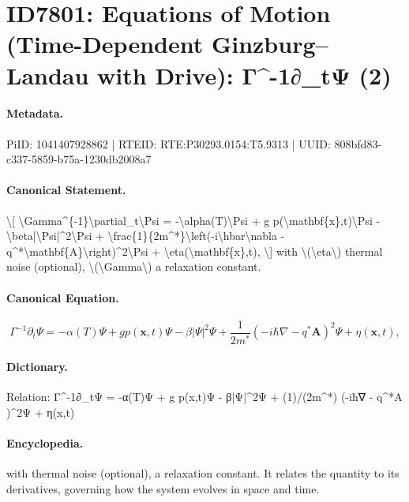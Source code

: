 \section*{ID7801: Equations of Motion (Time-Dependent Ginzburg–Landau with Drive): Γ\textasciicircum{}-1∂\_tΨ (2)}
\paragraph{Metadata.}
PiID: 1041407928862 | RTEID: RTE:P30293.0154:T5.9313 | UUID: 808bfd83-c337-5859-b75a-1230db2008a7

\paragraph{Canonical Statement.}
\textbackslash{}[ \textbackslash{}Gamma\textasciicircum{}\{-1\}\textbackslash{}partial\_t\textbackslash{}Psi = -\textbackslash{}alpha(T)\textbackslash{}Psi + g p(\textbackslash{}mathbf\{x\},t)\textbackslash{}Psi - \textbackslash{}beta|\textbackslash{}Psi|\textasciicircum{}2\textbackslash{}Psi + \textbackslash{}frac\{1\}\{2m\textasciicircum{}*\}\textbackslash{}left(-i\textbackslash{}hbar\textbackslash{}nabla - q\textasciicircum{}*\textbackslash{}mathbf\{A\}\textbackslash{}right)\textasciicircum{}2\textbackslash{}Psi + \textbackslash{}eta(\textbackslash{}mathbf\{x\},t), \textbackslash{}] with \textbackslash{}(\textbackslash{}eta\textbackslash{}) thermal noise (optional), \textbackslash{}(\textbackslash{}Gamma\textbackslash{}) a relaxation constant.

\paragraph{Canonical Equation.}
\[
\Gamma^{-1}\partial_t\Psi = -\alpha(T)\Psi + g p(\mathbf{x},t)\Psi - \beta|\Psi|^2\Psi + \frac{1}{2m^*}\left(-i\hbar\nabla - q^*\mathbf{A}\right)^2\Psi + \eta(\mathbf{x},t),
\]

\paragraph{Dictionary.}
Relation: Γ\textasciicircum{}-1∂\_tΨ = -α(T)Ψ + g p(x,t)Ψ - β|Ψ|\textasciicircum{}2Ψ + (1)/(2m\textasciicircum{}*) (-iħ∇ - q\textasciicircum{}*A )\textasciicircum{}2Ψ + η(x,t)

\paragraph{Encyclopedia.}
with thermal noise (optional), a relaxation constant. It relates the quantity to its derivatives, governing how the system evolves in space and time.
